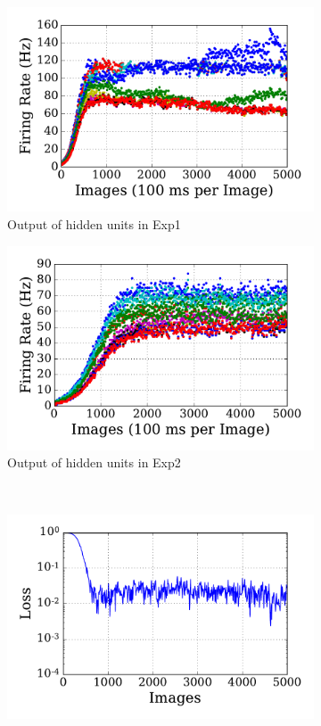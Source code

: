\begin{figure}
\begin{subfigure}[t]{0.48\textwidth}
		\includegraphics[width=\textwidth]{pics_sdlm/05_exp_SAE_teach_long/exp1_hid_s.pdf}
		\caption{Output of hidden units in Exp1}
	\end{subfigure}
	\begin{subfigure}[t]{0.48\textwidth}
		\includegraphics[width=\textwidth]{pics_sdlm/05_exp_SAE_teach_long/exp2_hid_s.pdf}
		\caption{Output of hidden units in Exp2}
	\end{subfigure}\\
	\begin{subfigure}[t]{0.48\textwidth}
		\includegraphics[width=\textwidth]{pics_sdlm/05_exp_SAE_teach_long/exp1_mse_nons.pdf}

\end{subfigure}
\end{figure}
